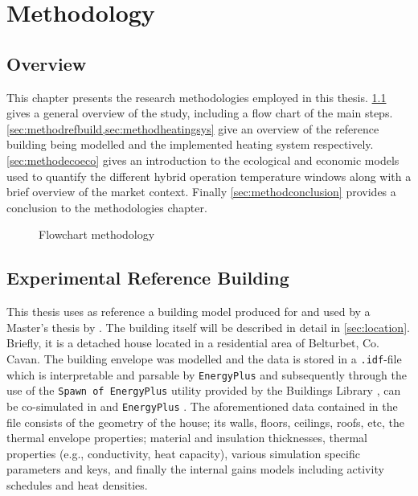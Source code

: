 \chapter{Methodology}\label{ch:method} 
\section{Overview} \label{sec:methodoverview}
This chapter presents the research methodologies employed in this thesis. \cref{sec:methodoverview} gives a general overview of the study, including a flow chart of the main steps. \cref{sec:methodrefbuild,sec:methodheatingsys} give an overview of the reference building being modelled and the implemented heating system respectively. \cref{sec:methodecoeco} gives an introduction to the ecological and economic models used to quantify the different hybrid operation temperature windows along with a brief overview of the market context. Finally \cref{sec:methodconclusion} provides a conclusion to the methodologies chapter.

\begin{figure}[htb]
    \centering
    
    \caption{Flowchart methodology}
    \label{fig:flowchartmethod}
\end{figure}



\section{Experimental Reference Building}\label{sec:methodrefbuild}
This thesis uses as reference a building model produced for and used by a Master's thesis by \citeauthor{keogh_technical_2018} \cite{keogh_technical_2018}. The building itself will be described in detail in \cref{sec:location}. Briefly, it is a detached house located in a residential area of Belturbet, Co. Cavan. The building envelope was modelled and the data is stored in a \texttt{.idf}-file which is interpretable and parsable by \texttt{EnergyPlus} and subsequently through the use of the \texttt{Spawn of EnergyPlus} utility provided by the Buildings Library \cite{wetter_modelica_2014}, can be co-simulated in \modelica and \texttt{EnergyPlus} \cite{wetter2021software}. The aforementioned data contained in the file consists of the geometry of the house; its walls, floors, ceilings, roofs, etc, the thermal envelope properties; material and insulation thicknesses, thermal properties (e.g., conductivity, heat capacity), various simulation specific parameters and keys, and finally the internal gains models including activity schedules and heat densities.  

